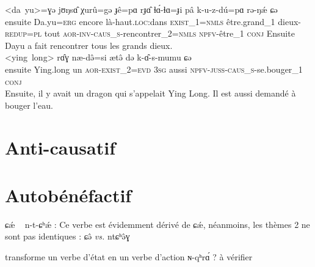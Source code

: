 \documentclass[11pt, a4paper]{book}              %
\newcommand{\ipa}[1]{{\phon \mbox{#1}}} %
\begin{document}
\begin{exe}
\begin{xlist}
 \ex 
\gll  \ipa{ægærêsi} \ipa{<da yu>=ɣə} \ipa{jʊŋsɑ̂} \ipa{χurû=gə} \ipa{ɟê=pɑ} \ipa{rɟɑ̂} \ipa{ɬɑ́-ɬɑ=ɟi} \ipa{pâ} \ipa{k-u-z-dú=pɑ} \ipa{rə-ŋǽ} \ipa{ɕə} \\
ensuite Da.yu=\textsc{erg} encore là-haut.\textsc{loc:}dans \textsc{exist_1=nmls} être.grand_1 dieux-\textsc{redup=pl} tout
\textsc{aor-inv-caus_s-}rencontrer_2=\textsc{nmls} \textsc{npfv-}être_1 \textsc{conj}
Ensuite Dayu a fait rencontrer tous les grands dieux. \\


\ex 
\gll \ipa{æɕə} \ipa{<ying long>} \ipa{rɑ̂ɣ} \ipa{næ-də̂=si} \ipa{ætə̂} \ipa{də} \ipa{k-ɑ̂-s-mumu} \ipa{ɕə} \\
ensuite Ying.long un \textsc{aor}-\textsc{exist_2=evd}  \textsc{3sg} aussi \textsc{npfv-juss-caus_s-}se.bouger_1 \textsc{conj}\\
Ensuite, il y avait un dragon qui s'appelait Ying Long. Il est aussi demandé à bouger l'eau. \\




\end{xlist}
\end{exe}

\section{Anti-causatif}

\section{Autobénéfactif}

\ipa{ɕǽ} ~ \ipa{n-t-ɕʰǽ} : Ce verbe est évidemment dérivé de \ipa{ɕǽ}, néanmoins, les thèmes 2 ne sont pas identiques :
\ipa{ɕə̂} \textit{vs.} \ipa{ntɕʰə̂ɣ}

transforme un verbe d'état en un verbe d'action \ipa{ɴ-qʰrɑ́} ? à vérifier
\end{document}
